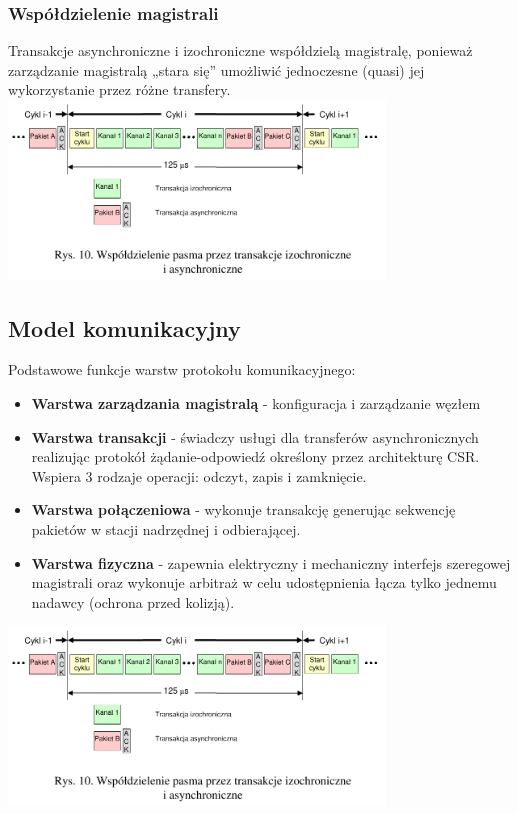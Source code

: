 \subsubsection{Współdzielenie magistrali}
Transakcje asynchroniczne i izochroniczne współdzielą magistralę, ponieważ zarządzanie magistralą „stara się” umożliwić jednoczesne (quasi) jej wykorzystanie przez różne transfery.\\
\includegraphics[width=10cm]{./wyklady/FIREWIRE_13_1.pdf}\\
\newpage
\subsection{Model komunikacyjny}
Podstawowe funkcje warstw protokołu komunikacyjnego:
\begin{itemize}
	\item \textbf{Warstwa zarządzania magistralą} - konfiguracja i zarządzanie węzłem
	\item \textbf{Warstwa transakcji} - świadczy usługi dla transferów asynchronicznych realizując protokół żądanie-odpowiedź określony przez architekturę CSR. Wspiera 3 rodzaje operacji: odczyt, zapis i zamknięcie.
	\item \textbf{Warstwa połączeniowa} - wykonuje transakcję generując sekwencję pakietów w stacji nadrzędnej i odbierającej.
	\item \textbf{Warstwa fizyczna} - zapewnia elektryczny i mechaniczny interfejs szeregowej magistrali oraz wykonuje arbitraż w celu udostępnienia łącza tylko jednemu nadawcy (ochrona przed kolizją).
\end{itemize}
\includegraphics[width=10cm]{./wyklady/FIREWIRE_13_1.pdf}

